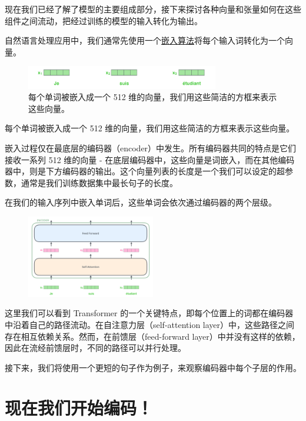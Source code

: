 \documentclass[cn,hazy,blue,10pt,normal]{elegantnote}
\begin{document}
现在我们已经了解了模型的主要组成部分，接下来探讨各种向量和张量如何在这些组件之间流动，把经过训练的模型的输入转化为输出。

自然语言处理应用中，我们通常先使用一个\href{https://medium.com/deeper-learning/glossary-of-deep-learning-word-embedding-f90c3cec34ca}{嵌入算法}将每个输入词转化为一个向量。
\begin{figure}[h]
	\centering
	\includegraphics[width=0.75\textwidth]{image/embeddings.png}
	\caption{每个单词被嵌入成一个 512 维的向量，我们用这些简洁的方框来表示这些向量。}
\end{figure}

每个单词被嵌入成一个 512 维的向量，我们用这些简洁的方框来表示这些向量。

嵌入过程仅在最底层的编码器（encoder）中发生。所有编码器共同的特点是它们接收一系列 512 维的向量 - 在底层编码器中，这些向量是词嵌入，而在其他编码器中，则是下方编码器的输出。这个向量列表的长度是一个我们可以设定的超参数，通常是我们训练数据集中最长句子的长度。

在我们的输入序列中嵌入单词后，这些单词会依次通过编码器的两个层级。
\begin{figure}[h]
	\centering
	\includegraphics[width=0.5\textwidth]{image/encoder_with_tensors.png}
\end{figure}

这里我们可以看到 Transformer 的一个关键特点，即每个位置上的词都在编码器中沿着自己的路径流动。在自注意力层（self-attention layer）中，这些路径之间存在相互依赖关系。然而，在前馈层（feed-forward layer）中并没有这样的依赖，因此在流经前馈层时，不同的路径可以并行处理。

接下来，我们将使用一个更短的句子作为例子，来观察编码器中每个子层的作用。

\section{现在我们开始编码！}
\end{document}
